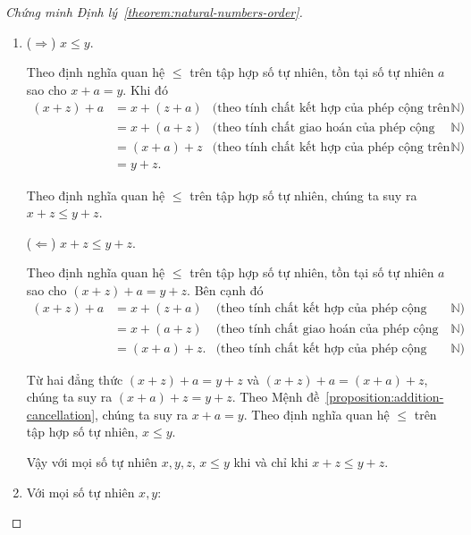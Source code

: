 \begin{proof}[Chứng minh Định lý~\ref{theorem:natural-numbers-order}]
    \begin{enumerate}[label={(\roman*)}]
        \item ($\Rightarrow$) $x\leq y$.

              Theo định nghĩa quan hệ $\leq$ trên tập hợp số tự nhiên, tồn tại số tự nhiên $a$ sao cho $x + a = y$. Khi đó
              \begin{align*}
                  (x + z) + a & = x + (z + a) & \text{(theo tính chất kết hợp của phép cộng trên $\mathbb{N}$)}   \\
                              & = x + (a + z) & \text{(theo tính chất giao hoán của phép cộng trên $\mathbb{N}$)} \\
                              & = (x + a) + z & \text{(theo tính chất kết hợp của phép cộng trên $\mathbb{N}$)}   \\
                              & = y + z.
              \end{align*}

              Theo định nghĩa quan hệ $\leq$ trên tập hợp số tự nhiên, chúng ta suy ra $x + z\leq y + z$.

              ($\Leftarrow$) $x + z\leq y + z$.

              Theo định nghĩa quan hệ $\leq$ trên tập hợp số tự nhiên, tồn tại số tự nhiên $a$ sao cho $(x + z) + a = y + z$. Bên cạnh đó
              \begin{align*}
                  (x + z) + a & = x + (z + a)  & \text{(theo tính chất kết hợp của phép cộng trên $\mathbb{N}$)}   \\
                              & = x + (a + z)  & \text{(theo tính chất giao hoán của phép cộng trên $\mathbb{N}$)} \\
                              & = (x + a) + z. & \text{(theo tính chất kết hợp của phép cộng trên $\mathbb{N}$)}
              \end{align*}

              Từ hai đẳng thức $(x + z) + a = y + z$ và $(x + z) + a = (x + a) + z$, chúng ta suy ra $(x + a) + z = y + z$. Theo Mệnh đề~\ref{proposition:addition-cancellation}, chúng ta suy ra $x + a = y$. Theo định nghĩa quan hệ $\leq$ trên tập hợp số tự nhiên, $x\leq y$.

              Vậy với mọi số tự nhiên $x, y, z$, $x\leq y$ khi và chỉ khi $x + z \leq y + z$.
        \item Với mọi số tự nhiên $x, y$:


\end{enumerate}
\end{proof}
